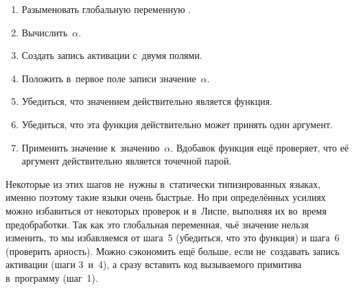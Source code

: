 \begin{enumerate}
  \item Разыменовать глобальную переменную .

  \item Вычислить~$\alpha$.

  \item Создать запись активации с~двумя полями.

  \item Положить в~первое поле записи значение~$\alpha$.

  \item Убедиться, что значением  действительно является
        функция.

  \item Убедиться, что эта функция действительно может принять
        один аргумент.

  \item Применить значение  к~значению~$\alpha$. Вдобавок
        функция  ещё проверяет, что её аргумент действительно
        является точечной парой.
\end{enumerate}

Некоторые из этих шагов не~нужны в~статически типизированных языках, именно
поэтому такие языки очень быстрые. Но при определённых усилиях можно избавиться
от некоторых проверок и в~Лиспе, выполняя их во~время предобработки. Так как
 это глобальная переменная, чьё значение нельзя изменить, то мы
избавляемся от шага~5 (убедиться, что это функция) и шага~6 (проверить арность).
Можно сэкономить ещё больше, если не~создавать запись активации (шаги 3~и~4), а
сразу вставить код вызываемого примитива в~программу (шаг~1).

